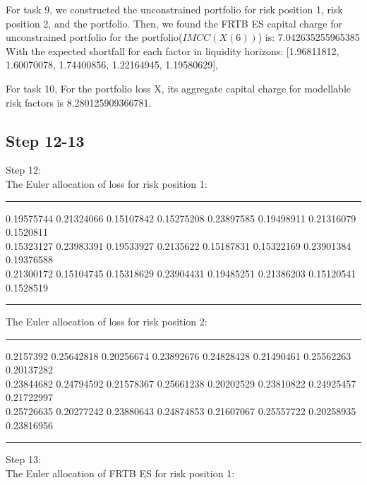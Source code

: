 \documentclass{article}
\begin{document}
\noindent For task 9, we constructed the unconstrained portfolio for risk position 1, risk position 2, and the portfolio. Then, we found the FRTB ES capital charge for unconstrained portfolio for the portfolio($IMCC(X(6))$) is:
7.042635255965385
With the expected shortfall for each factor in liquidity horizons:
[1.96811812, 1.60070078, 1.74400856, 1.22164945, 1.19580629],

\noindent For task 10, For the portfolio loss X, its aggregate capital charge for modellable risk factors is
8.280125909366781.


\subsection*{Step 12-13}
Step 12:\\
The Euler allocation of loss for risk position 1:\\
\hrule \vspace{5pt}
  0.19575744 0.21324066 0.15107842 0.15275208
0.23897585 0.19498911 0.21316079 0.1520811\\  0.15323127
0.23983391 0.19533927 0.2135622  0.15187831 0.15322169
0.23901384 0.19376588\\ 0.21300172 0.15104745 0.15318629
0.23904431 0.19485251 0.21386203 0.15120541 0.1528519 \\ 
\hrule \vspace{5pt}
\noindent The Euler allocation of loss for risk position 2:\\
\hrule \vspace{5pt}
 0.2157392  0.25642818 0.20256674 0.23892676
0.24828428 0.21490461 0.25562263 0.20137282\\ 0.23844682
0.24794592 0.21578367 0.25661238 0.20202529 0.23810822
0.24925457 0.21722997\\ 0.25726635 0.20277242 0.23880643
0.24874853 0.21607067 0.25557722 0.20258935 0.23816956 \\
\hrule \vspace{5pt}
\vspace{15pt}
\noindent Step 13:\\
The Euler allocation of FRTB ES for risk position 1:
\begin{table}[H]
\centering
  \label{tab:my-tab1}
  \end{table}
\end{document}
